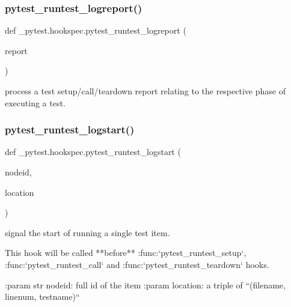 \subsubsection{\texorpdfstring{pytest\+\_\+runtest\+\_\+logreport()}{pytest\_runtest\_logreport()}}
{\footnotesize\ttfamily def \+\_\+pytest.\+hookspec.\+pytest\+\_\+runtest\+\_\+logreport (\begin{DoxyParamCaption}\item[{}]{report }\end{DoxyParamCaption})}

\begin{DoxyVerb}process a test setup/call/teardown report relating to
the respective phase of executing a test. \end{DoxyVerb}
 \mbox{\label{namespace__pytest_1_1hookspec_a5b76875e80ea668bb17d1bd097393e27}} 
\subsubsection{\texorpdfstring{pytest\+\_\+runtest\+\_\+logstart()}{pytest\_runtest\_logstart()}}
{\footnotesize\ttfamily def \+\_\+pytest.\+hookspec.\+pytest\+\_\+runtest\+\_\+logstart (\begin{DoxyParamCaption}\item[{}]{nodeid,  }\item[{}]{location }\end{DoxyParamCaption})}

\begin{DoxyVerb}signal the start of running a single test item.

This hook will be called **before** :func:`pytest_runtest_setup`, :func:`pytest_runtest_call` and
:func:`pytest_runtest_teardown` hooks.

:param str nodeid: full id of the item
:param location: a triple of ``(filename, linenum, testname)``
\end{DoxyVerb}
 \mbox{\label{namespace__pytest_1_1hookspec_a9062f435f95835f3cbd0b5fba2f457a2}} 
